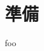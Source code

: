 \documentclass[../main.tex]{subfiles}
\begin{document}
\chapter{準備}

\begin{dfn}\label{dfn:fuga}
    foo
\end{dfn}
\fi
\end{document}
